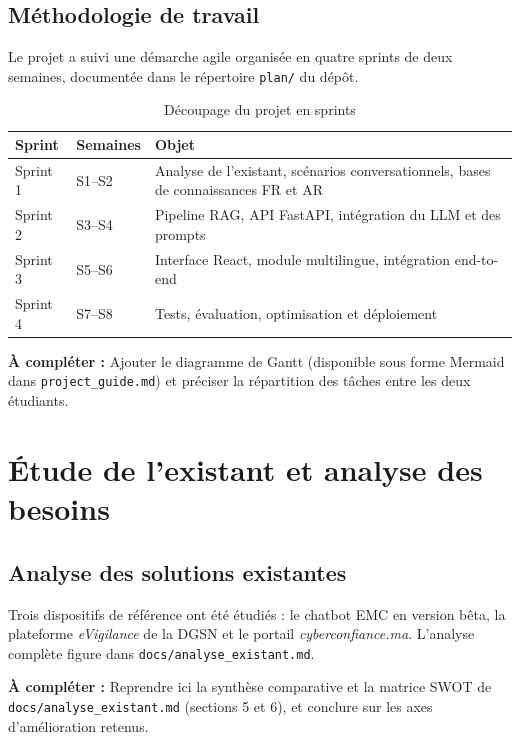 \documentclass[a4paper,11pt,twoside]{report}
\newcommand{\todo}[1]{%
  \begin{tcolorbox}[colback=yellow!12,colframe=orange!70!black,left=4pt,right=4pt,top=3pt,bottom=3pt]
  \small\textbf{À compléter :} #1
  \end{tcolorbox}}
\begin{document}
\section{Méthodologie de travail}

Le projet a suivi une démarche agile organisée en quatre sprints de deux
semaines, documentée dans le répertoire \texttt{plan/} du dépôt.

\begin{table}[htbp]
\centering
\small
\begin{tabular}{@{}llp{7.2cm}@{}}
\toprule
\textbf{Sprint} & \textbf{Semaines} & \textbf{Objet} \\
\midrule
Sprint 1 & S1--S2 & Analyse de l'existant, scénarios conversationnels, bases de connaissances FR et AR \\
Sprint 2 & S3--S4 & Pipeline RAG, API FastAPI, intégration du LLM et des prompts \\
Sprint 3 & S5--S6 & Interface React, module multilingue, intégration end-to-end \\
Sprint 4 & S7--S8 & Tests, évaluation, optimisation et déploiement \\
\bottomrule
\end{tabular}
\caption{Découpage du projet en sprints}
\label{tab:sprints}
\end{table}

\todo{Ajouter le diagramme de Gantt (disponible sous forme Mermaid dans
\texttt{project\_guide.md}) et préciser la répartition des tâches entre les deux
étudiants.}

\chapter{Étude de l'existant et analyse des besoins}
\label{chap:existant}

\section{Analyse des solutions existantes}

Trois dispositifs de référence ont été étudiés : le chatbot EMC en version bêta,
la plateforme \emph{eVigilance} de la DGSN et le portail
\emph{cyberconfiance.ma}. L'analyse complète figure dans
\texttt{docs/analyse\_existant.md}.

\todo{Reprendre ici la synthèse comparative et la matrice SWOT de
\texttt{docs/analyse\_existant.md} (sections 5 et 6), et conclure sur les axes
d'amélioration retenus.}
\end{document}
